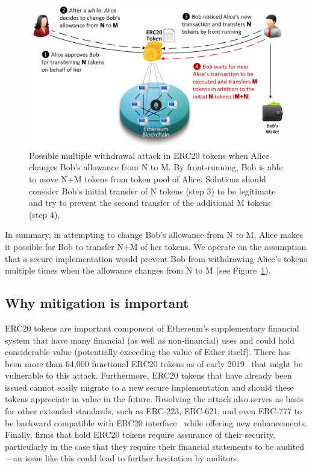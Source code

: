 \begin{figure}[ht]
	\centering
	\includegraphics[width=1.0\linewidth]{figures/multiple_withdrawal_02.png}
	\caption{Possible multiple withdrawal attack in ERC20 tokens when Alice changes Bob's allowance from N to M. By front-running, Bob is able to move N+M tokens from token pool of Alice. Solutions should consider Bob's initial transfer of N tokens (step 3) to be legitimate and try to prevent the second transfer of the additional M tokens (step 4).\label{fig:mwa}}
\end{figure}

In summary, in attempting to change Bob's allowance from N to M, Alice makes it possible for Bob to transfer N+M of her tokens. We operate on the assumption that a secure implementation would prevent Bob from withdrawing Alice's tokens multiple times when the allowance changes from N to M (see Figure~\ref{fig:mwa}).

\subsection{Why mitigation is important}

ERC20 tokens are important component of Ethereum's supplementary financial system that have many financial (as well as non-financial) uses and could hold considerable value (potentially exceeding the value of Ether itself). There has been more than 64,000 functional ERC20 tokens as of early 2019~\cite{victormeasuring} that might be vulnerable to this attack. Furthermore, ERC20 tokens that have already been issued cannot easily migrate to a new secure implementation and should these tokens appreciate in value in the future. Resolving the attack also serves as basis for other extended standards, such as ERC-223, ERC-621, and even ERC-777 to be backward compatible with ERC20 interface~\cite{frowis2018detecting} while offering new enhancements. Finally, firms that hold ERC20 tokens require assurance of their security, particularly in the case that they require their financial statements to be audited---an issue like this could lead to further hesitation by auditors.

